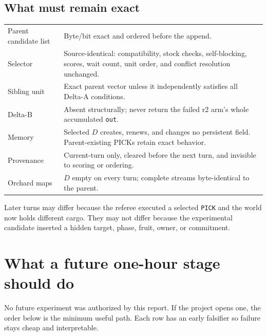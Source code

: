 \documentclass[10pt,a4paper]{article}
\newcommand{\code}[1]{\texttt{#1}}
\begin{document}
\subsection{What must remain exact}

\begin{tabularx}{\textwidth}{@{}p{37mm}Y@{}}
\toprule
Parent candidate list & Byte/bit exact and ordered before the append. \\
Selector & Source-identical: compatibility, stock checks, self-blocking, scores, wait count, unit order, and conflict resolution unchanged. \\
Sibling unit & Exact parent vector unless it independently satisfies all Delta-A conditions. \\
Delta-B & Absent structurally; never return the failed r2 arm's whole accumulated \code{out}. \\
Memory & Selected $D$ creates, renews, and changes no persistent field. Parent-existing PICKs retain exact behavior. \\
Provenance & Current-turn only, cleared before the next turn, and invisible to scoring or ordering. \\
Orchard maps & $D$ empty on every turn; complete streams byte-identical to the parent. \\
\bottomrule
\end{tabularx}

Later turns may differ because the referee executed a selected \code{PICK} and the world now holds
different cargo. They may not differ because the experimental candidate inserted a hidden target,
phase, fruit, owner, or commitment.

\section{What a future one-hour stage should do}

No future experiment was authorized by this report. If the project opens one, the order below is
the minimum useful path. Each row has an early falsifier so failure stays cheap and interpretable.
\end{document}
